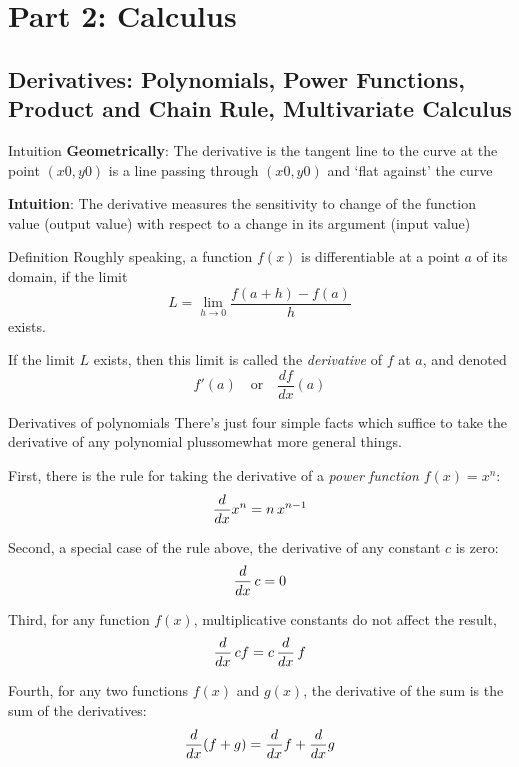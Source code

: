 \section{Part 2: Calculus}

\subsection{Derivatives: Polynomials, Power Functions, Product and Chain Rule, Multivariate Calculus}

\begin{frame}{Intuition}
    \textbf{Geometrically}: The derivative is the tangent line to the curve at the point $(x0, y0)$
    is a line passing through $(x0, y0)$ and `flat against' the curve

    \begin{center}
        
    \end{center}

    \textbf{Intuition}: The derivative measures the sensitivity to change of the function value
    (output value) with respect to a change in its argument (input value)\\[5mm]

\end{frame}

\begin{frame}{Definition}
    Roughly speaking, a function $f(x)$ is differentiable at a point $a$ of its domain,
    if the limit
    $$L=\lim_{h \to 0}\frac{f(a+h)-f(a)}h$$
    exists.

    \begin{boxed}
        If the limit $L$ exists, then this limit is called the \emph{derivative} of $f$ at $a$,
        and denoted $$f'(a) \quad \text{or} \quad \frac{df}{dx}(a)$$
    \end{boxed}
\end{frame}



\begin{frame}{Derivatives of polynomials}
    There's just four simple facts which suffice to take the derivative
    of any polynomial plussomewhat more general things.

    First, there is the rule for taking the derivative of a \emph{power function}
    $f(x)=x^n$:
    $${d\over dx}x^n=n\,x^{n-1}$$

    Second, a special case of the rule above, the derivative of any constant $c$ is zero:
    $${d\over dx}\,c=0$$

    Third, for any function $f(x)$, multiplicative constants do not affect the result,
    $${d\over dx}\,c f=c \,{d\over dx}\,f$$

    Fourth, for any two functions $f(x)$ and  $g(x)$, the derivative of the sum
    is the sum of the derivatives:
    $${d\over dx}(f+g)={d\over dx}f+{d\over dx}g$$
\end{frame}

